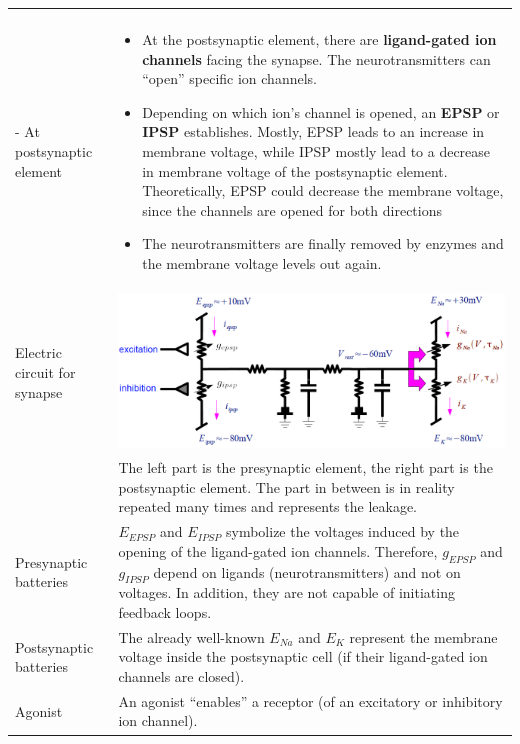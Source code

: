 \begin{longtable}{p{4cm}p{15cm}}
\begin{itemize}
                        	  \end{itemize}\\
- At postsynaptic element	& \begin{itemize}
                         	  	\item At the postsynaptic element, there are \textbf{ligand-gated ion channels} facing the synapse. The neurotransmitters can ``open'' specific ion channels.
					\item Depending on which ion's channel is opened, an \textbf{EPSP} or \textbf{IPSP} establishes. Mostly, EPSP leads to an increase in membrane voltage, while IPSP mostly lead to a decrease in membrane voltage of the postsynaptic element. Theoretically, EPSP could decrease the membrane voltage, since the channels are opened for both directions
					\item The neurotransmitters are finally removed by enzymes and the membrane voltage levels out again.
                         	  \end{itemize}\\
Electric circuit for synapse	& \includegraphics[width = 15cm]{neuroinf_synapse.png}\\
		& The left part is the presynaptic element, the right part is the postsynaptic element. The part in between is in reality repeated many times and represents the leakage.\\
Presynaptic batteries	& $E_{EPSP}$ and $E_{IPSP}$ symbolize the voltages induced by the opening of the ligand-gated ion channels. Therefore, $g_{EPSP}$ and $g_{IPSP}$ depend on ligands (neurotransmitters) and not on voltages. In addition, they are not capable of initiating feedback loops.\\
Postsynaptic batteries	& The already well-known $E_{Na}$ and $E_K$ represent the membrane voltage inside the postsynaptic cell (if their ligand-gated ion channels are closed).\\
Agonist			& An agonist ``enables'' a receptor (of an excitatory or inhibitory ion channel).\\

\end{longtable}

